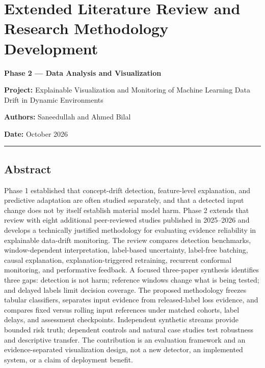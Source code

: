 \documentclass[
]{article}
\author{}
\date{}
\begin{document}
{
\setcounter{tocdepth}{2}
\tableofcontents
}
\hypertarget{extended-literature-review-and-research-methodology-development}{%
\section{Extended Literature Review and Research Methodology
Development}\label{extended-literature-review-and-research-methodology-development}}

\textbf{Phase 2 --- Data Analysis and Visualization}

\textbf{Project:} Explainable Visualization and Monitoring of Machine
Learning Data Drift in Dynamic Environments

\textbf{Authors:} Saneedullah and Ahmed Bilal

\textbf{Date:} October 2026

\begin{center}\rule{0.5\linewidth}{0.5pt}\end{center}

\hypertarget{abstract}{%
\subsection{Abstract}\label{abstract}}

Phase 1 established that concept-drift detection, feature-level
explanation, and predictive adaptation are often studied separately, and
that a detected input change does not by itself establish material model
harm. Phase 2 extends that review with eight additional peer-reviewed
studies published in 2025--2026 and develops a technically justified
methodology for evaluating evidence reliability in explainable
data-drift monitoring. The review compares detection benchmarks,
window-dependent interpretation, label-based uncertainty, label-free
batching, causal explanation, explanation-triggered retraining,
recurrent conformal monitoring, and performative feedback. A focused
three-paper synthesis identifies three gaps: detection is not harm;
reference windows change what is being tested; and delayed labels limit
decision coverage. The proposed methodology freezes tabular classifiers,
separates input evidence from released-label loss evidence, and compares
fixed versus rolling input references under matched cohorts, label
delays, and assessment checkpoints. Independent synthetic streams
provide bounded risk truth; dependent controls and natural case studies
test robustness and descriptive transfer. The contribution is an
evaluation framework and an evidence-separated visualization design, not
a new detector, an implemented system, or a claim of deployment benefit.
\end{document}
